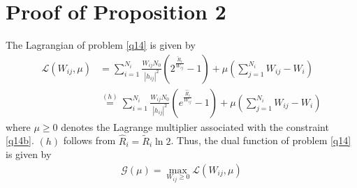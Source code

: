 \documentclass[journal]{IEEEtran}
\begin{document}
\section{Proof of Proposition 2}
The Lagrangian of problem \eqref{q14} is given by
\begin{align}
\mathcal{L}\left(W_{ij}, \mu\right) &=  \sum\limits_{i = 1}^{N_i} \frac{W_{ij}N_0}{\left|h_{ij}\right|^2}\left(2^{\frac{\tilde{R}_i}{W_{ij}}} - 1\right) + \mu\left(\sum_{j = 1}^{N_i}W_{ij} - W_i\right) \nonumber \\ 
& \overset{\left(h\right)}{=} \sum\limits_{i = 1}^{N_i} \frac{W_{ij}N_0}{\left|h_{ij}\right|^2}\left(e^{\frac{\hat{R}_i}{W_{ij}}} - 1\right) + \mu\left(\sum_{j = 1}^{N_i}W_{ij} - W_i\right) 
\end{align}
where $\mu \geq 0$ denotes the Lagrange multiplier associated with the constraint \eqref{q14b}. $\left(h\right)$ follows from $\hat{R}_i = \tilde{R}_i \ln2$. Thus, the dual function of problem \eqref{q14} is given by
\begin{align}
\mathcal{G}\left(\mu\right) = \max_{W_{ij}\geq 0} \mathcal{L}\left(W_{ij},\mu\right)
\end{align}
\end{document}
